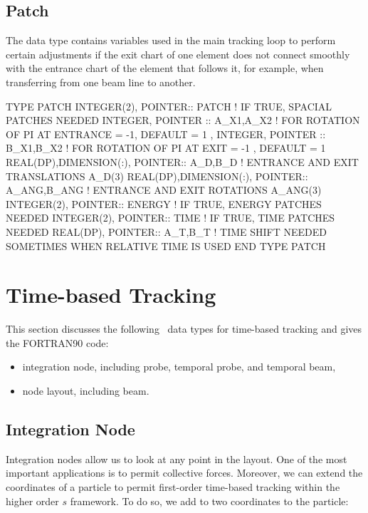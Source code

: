 \subsection{Patch}

The data type  contains variables used in the main tracking loop to
perform certain adjustments if the exit chart of one element does
not connect smoothly with the entrance chart of the element that follows
it, for example, when transferring from one beam line to another.

\begin{ptccode}
TYPE PATCH
  INTEGER(2), POINTER:: PATCH
  ! IF TRUE, SPACIAL PATCHES NEEDED
  INTEGER, POINTER :: A_X1,A_X2
  ! FOR ROTATION OF PI AT ENTRANCE = -1, DEFAULT = 1 ,
  INTEGER, POINTER :: B_X1,B_X2
  ! FOR ROTATION OF PI AT EXIT = -1    , DEFAULT = 1
  REAL(DP),DIMENSION(:), POINTER:: A_D,B_D
  ! ENTRANCE AND EXIT TRANSLATIONS  A_D(3)
  REAL(DP),DIMENSION(:), POINTER:: A_ANG,B_ANG
  ! ENTRANCE AND EXIT ROTATIONS    A_ANG(3)
  INTEGER(2), POINTER:: ENERGY
  ! IF TRUE, ENERGY PATCHES NEEDED
  INTEGER(2), POINTER:: TIME
  ! IF TRUE, TIME PATCHES NEEDED
  REAL(DP), POINTER:: A_T,B_T
  ! TIME SHIFT NEEDED SOMETIMES WHEN RELATIVE TIME IS USED
END TYPE PATCH
\end{ptccode}


\section{Time-based Tracking}

This section discusses the following \PTC\ data types for time-based tracking
and gives the FORTRAN90 code:
\begin{itemize}
  \item integration node, including probe, temporal probe, and temporal beam,
  \item node layout, including beam.
\end{itemize}


\subsection{Integration Node}

Integration nodes allow us to look at any point in the layout. One of
the most important applications is to permit collective forces. Moreover,
we can extend the coordinates of a particle to permit first-order
time-based tracking within the higher order $s$ framework. To do so,
we add to two coordinates to the particle:

